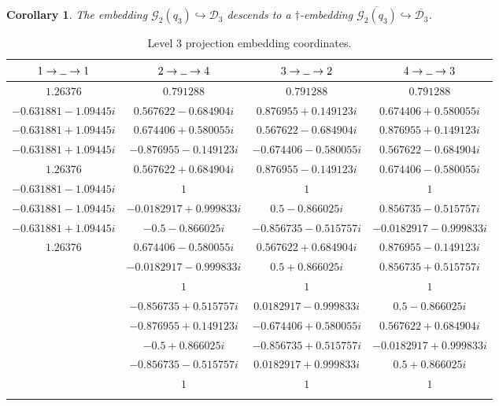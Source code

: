 \documentclass[pdflatex,sn-mathphys-num]{sn-jnl}%
\theoremstyle{thmstyleone}%
\newtheorem{corollary}{Corollary}
\theoremstyle{thmstyletwo}%
\theoremstyle{thmstylethree}%
\newcommand{\DD}{\mathcal{D}}
\newcommand{\GG}{\mathcal{G}}
\newcommand{\ol}{\overline}
\newcommand{\blank}{\rule{0.2cm}{0.15mm}}
\begin{document}
\begin{corollary}\label{cor:D3-dagger-emb}
    The embedding $\GG_2(q_3) \hookrightarrow \DD_3$ descends to a 
    $\dagger$-embedding $\ol{\GG_2(q_3)} \hookrightarrow \ol{\DD_3}$.
\end{corollary}




\begin{table}
    \caption{Level 3 projection embedding coordinates.}
    \label{tab:lvl-3-proj-coefs}
    \begin{tabular}{c|c|c|c}
        \toprule
        $1\to\blank\to1$                    & $2\to\blank\to4$                  & $3\to\blank\to2$               & $4\to\blank\to3$ \\ 
        \midrule
        $1.26376$              & $0.791288$                & $0.791288 $              & $0.791288$ \\
        $-0.631881-1.09445 i$   & $0.567622 - 0.684904 i$   & $0.876955 + 0.149123 i$  & $0.674406 + 0.580055 i$ \\
        $-0.631881+1.09445 i$   & $0.674406 + 0.580055 i$   & $0.567622 - 0.684904 i$  & $0.876955 + 0.149123 i$ \\
        $-0.631881+1.09445 i$   & $-0.876955 - 0.149123 i$  & $-0.674406 - 0.580055 i$ & $0.567622 - 0.684904 i$ \\
        $1.26376$               & $0.567622 + 0.684904 i$   & $0.876955 - 0.149123 i$ & $0.674406 - 0.580055 i$ \\
        $-0.631881-1.09445 i$   & $1$                       & $1$                      & $1$ \\
        $-0.631881-1.09445 i$   & $-0.0182917 + 0.999833 i$ & $0.5 - 0.866025 i$       & $0.856735 - 0.515757 i$ \\
        $-0.631881+1.09445i$    & $-0.5 - 0.866025 i$       & $-0.856735 - 0.515757 i$ & $-0.0182917 - 0.999833 i$ \\
        $1.26376$               & $0.674406 - 0.580055 i$   & $0.567622 + 0.684904 i$  & $0.876955 - 0.149123 i$ \\ 
                              & $-0.0182917 - 0.999833 i$ & $0.5 + 0.866025 i$       & $0.856735 + 0.515757 i$ \\
                              & $1$                       & $1$                      & $1$ \\
                              & $-0.856735 + 0.515757 i$  & $0.0182917 - 0.999833 i$ & $0.5 - 0.866025 i$ \\
                              & $-0.876955 + 0.149123 i$  & $-0.674406 + 0.580055 i$ & $0.567622 + 0.684904 i$ \\
                              & $-0.5 + 0.866025 i$       & $-0.856735 + 0.515757 i$ & $-0.0182917 + 0.999833 i$ \\
                              & $-0.856735 - 0.515757 i$  & $0.0182917 + 0.999833 i$ & $0.5 + 0.866025 i$ \\
                              & $1$                       & $1$                      & $1$ \\
    \botrule
    \end{tabular}
\end{table}
\end{document}
